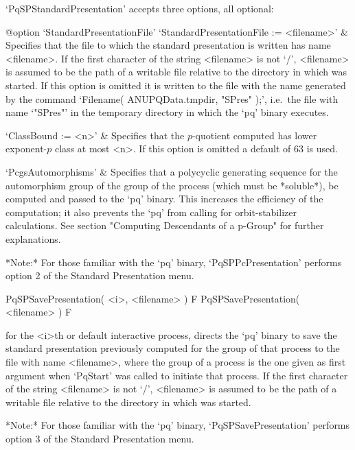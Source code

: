 `PqSPStandardPresentation' accepts three options, all optional:

\beginitems

%
{@option \noexpand`StandardPresentationFile'}
`StandardPresentationFile := <filename>' &
Specifies that the file to which the standard presentation is written has
name <filename>. If the first character of the string <filename>  is  not
`/', <filename> is assumed to be the path of a writable file relative  to
the directory in which {\GAP} was started. If this option is  omitted  it
is written to the file with the name generated by the command  `Filename(
ANUPQData.tmpdir, "SPres" );', i.e.~the file with name `"SPres"'  in  the
temporary directory in which the `pq' binary executes.

`ClassBound := <n>' &
Specifies that the $p$-quotient computed has lower exponent-$p$ class  at
most <n>. If this option is omitted a default of 63 is used.

`PcgsAutomorphisms' &
Specifies that a polycyclic  generating  sequence  for  the  automorphism
group of the group of the process (which must be *soluble*), be  computed
and passed to the `pq' binary.  This  increases  the  efficiency  of  the
computation;  it  also  prevents  the  `pq'  from  calling   {\GAP}   for
orbit-stabilizer calculations. See section "Computing  Descendants  of  a
p-Group" for further explanations.

\enditems

*Note:* For those familiar with  the  `pq'  binary,  `PqSPPcPresentation'
performs option 2 of the Standard Presentation menu.

\>PqSPSavePresentation( <i>, <filename> ) F
\>PqSPSavePresentation( <filename> ) F

for the <i>th or default interactive {\ANUPQ} process, directs  the  `pq'
binary to save the standard  presentation  previously  computed  for  the
group of that process to the file with name <filename>, where  the  group
of a process is the one given as first argument when `PqStart' was called
to initiate that process. If the first character of the string <filename>
is not `/', <filename> is assumed to be  the  path  of  a  writable  file
relative to the directory in which {\GAP} was started.

*Note:* For those familiar with the `pq'  binary,  `PqSPSavePresentation'
performs option 3 of the Standard Presentation menu.

